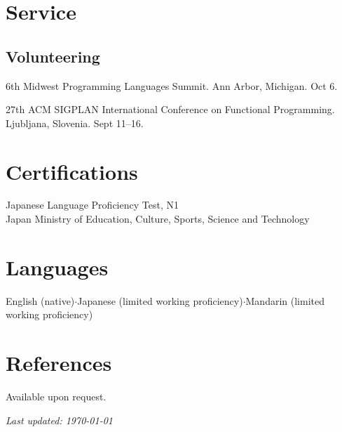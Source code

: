 \documentclass[11pt,letterpaper]{report} %
\begin{document}
\section*{Service}

\subsection*{Volunteering}
\begin{tablist}
  \item[2023] \tab{}6th Midwest Programming Languages Summit.
      Ann Arbor, Michigan.
      Oct 6.

  \item[2022] \tab{}27th ACM SIGPLAN International Conference on Functional Programming.
      Ljubljana, Slovenia.
      Sept 11--16.
\end{tablist}

\section*{Certifications}
\begin{tablist}
  \item[2024] \tab{}Japanese Language Proficiency Test, N1 \\
                Japan Ministry of Education, Culture, Sports, Science and Technology
\end{tablist}

\section*{Languages}
English (native)\enspace $\cdot$\enspace Japanese (limited working proficiency)\enspace $\cdot$\enspace Mandarin (limited working proficiency)

\section*{References}
Available upon request.

\begin{center}
    \vfill
    \emph{Last updated: \monthyeardate\today}
\end{center}
\end{document}
